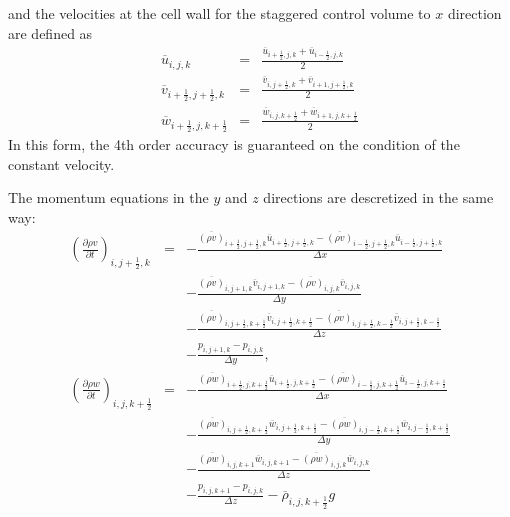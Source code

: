 and the velocities at the cell wall for the staggered control volume to $x$ direction are
defined as
\begin{eqnarray}
\overline{u}_{i,j,k} &=& \frac{\overline{u}_{i+\frac{1}{2},j,k}+\overline{u}_{i-\frac{1}{2},j,k}}{2}\\
\overline{v}_{i+\frac{1}{2},j+\frac{1}{2},k} &=&
\frac{\overline{v}_{i,j+\frac{1}{2},k}+\overline{v}_{i+1,j+\frac{1}{2},k}}{2}\\
\overline{w}_{i+\frac{1}{2},j,k+\frac{1}{2}} &=&
\frac{\overline{w}_{i,j,k+\frac{1}{2}}+\overline{w}_{i+1,j,k+\frac{1}{2}}}{2}
\end{eqnarray}
In this form, the 4th order accuracy is guaranteed
on the condition of the constant velocity.

The momentum equations in the $y$ and $z$ directions are descretized
in the same way:
\begin{eqnarray}
\left(\frac{\partial \rho v}{\partial t}\right)_{i,j+\frac{1}{2},k}
&=& - \frac{\overline{(\rho v)}_{i+\frac{1}{2},j+\frac{1}{2},k}  \overline{u}_{i+\frac{1}{2},j+\frac{1}{2},k}
           -\overline{(\rho v)}_{i-\frac{1}{2},j+\frac{1}{2},k}  \overline{u}_{i-\frac{1}{2},j+\frac{1}{2},k}}
     {\Delta x}\nonumber\\
& & - \frac{\overline{(\rho v)}_{i,j+1,k} \overline{v}_{i,j+1,k}
           -\overline{(\rho v)}_{i,j,k} \overline{v}_{i,j,k}}
     {\Delta y}\nonumber\\
& & - \frac{\overline{(\rho v)}_{i,j+\frac{1}{2},k+\frac{1}{2}}  \overline{v}_{i,j+\frac{1}{2},k+\frac{1}{2}}
           -\overline{(\rho v)}_{i,j+\frac{1}{2},k-\frac{1}{2}}  \overline{v}_{i,j+\frac{1}{2},k-\frac{1}{2}}}
     {\Delta z}\nonumber\\
& & -\frac{p_{i,j+1,k}-p_{i,j,k}}{\Delta y},\\
\left(\frac{\partial \rho w}{\partial t}\right)_{i,j,k+\frac{1}{2}}
&=& - \frac{\overline{(\rho w)}_{i+\frac{1}{2},j,k+\frac{1}{2}}  \overline{u}_{i+\frac{1}{2},j,k+\frac{1}{2}}
           -\overline{(\rho w)}_{i-\frac{1}{2},j,k+\frac{1}{2}}  \overline{u}_{i-\frac{1}{2},j,k+\frac{1}{2}}}
     {\Delta x}\nonumber\\
& & - \frac{\overline{(\rho w)}_{i,j+\frac{1}{2},k+\frac{1}{2}}  \overline{w}_{i,j+\frac{1}{2},k+\frac{1}{2}}
           -\overline{(\rho w)}_{i,j-\frac{1}{2},k+\frac{1}{2}}  \overline{w}_{i,j-\frac{1}{2},k+\frac{1}{2}}}
     {\Delta y}\nonumber\\
& & - \frac{\overline{(\rho w)}_{i,j,k+1} \overline{w}_{i,j,k+1}
           -\overline{(\rho w)}_{i,j,k} \overline{w}_{i,j,k}}
     {\Delta z}\nonumber\\
& & -\frac{p_{i,j,k+1}-p_{i,j,k}}{\Delta z}-\overline{\rho}_{i,j,k+\frac{1}{2}} g
\end{eqnarray}

